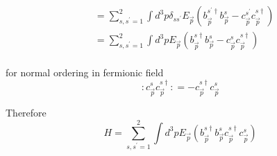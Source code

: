 \documentclass[12pt, letterpaper]{article}
\newcommand*{\1}{\hspace{1pt}}
\begin{document}
\begin{align*}
    &= \sum _{s, s^{\prime} = 1} ^{2} \int d ^{3}p \delta _{s s^{\prime}} E_{\overrightarrow{p}}(b^{s ^{\prime} \dagger} _{\overrightarrow{p}}b^{s} _{\overrightarrow{p}} - c^{s ^{\prime}} _{\overrightarrow{p}}c^{s \dagger} _{\overrightarrow{p}}) \\
    &= \sum _{s, s^{\prime} = 1} ^{2} \int d ^{3}p E_{\overrightarrow{p}}(b^{s \dagger} _{\overrightarrow{p}}b^{s} _{\overrightarrow{p}} - c^{s} _{\overrightarrow{p}}c^{s \dagger} _{\overrightarrow{p}}) \\
\end{align*}

for normal ordering in fermionic field 
\begin{equation}
    :c^{s} _{\overrightarrow{p}}c^{s \dagger} _{\overrightarrow{p}}: =  - c^{s \dagger} _{\overrightarrow{p}}c^{s} _{\overrightarrow{p}}
\end{equation}

Therefore 
\begin{equation}
   H = \sum _{s, s^{\prime} = 1} ^{2} \int d ^{3}p E_{\overrightarrow{p}}(b^{s \dagger} _{\overrightarrow{p}}b^{s} _{\overrightarrow{p}} c^{s \dagger} _{\overrightarrow{p}}c^{s} _{\overrightarrow{p}})
\end{equation}
\end{document}
